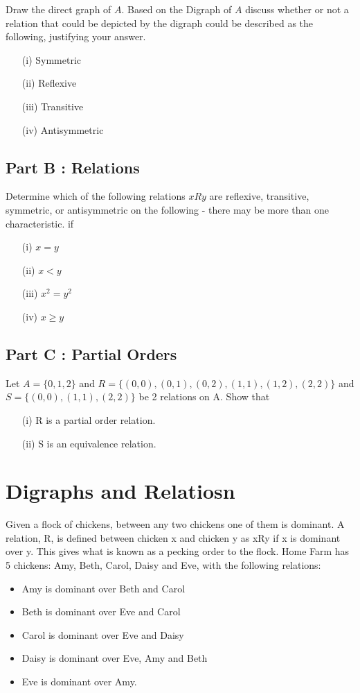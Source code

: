 Draw the direct graph of $A$. Based on the Digraph of $A$ discuss whether or not a relation that could be depicted by the digraph could be described as the following, justifying your answer.


\begin{itemize}
\item[(i)] Symmetric
\item[(ii)] Reflexive 
\item[(iii)] Transitive
\item[(iv)] Antisymmetric
\end{itemize}
\subsection*{Part B : Relations}
Determine which of the following relations $ x R y$ are reflexive, transitive, symmetric, or antisymmetric on the following - there may be more than one characteristic.  if

\begin{itemize} 
\item[(i)] $x = y$
\item[(ii)] $x < y$
\item[(iii)] $x^2 = y^2$
\item[(iv)] $x \geq y$
\end{itemize}
\subsection*{Part C : Partial Orders}

Let $A=\{0,1,2\}$ and $R=\{ (0,0),(0,1),(0,2),(1,1), (1,2), (2,2)\}$
and $S=\{(0,0),(1,1),(2,2)\}$ be 2 relations on A. Show that

\begin{itemize}
\item[(i)] R is a partial order relation.
\item[(ii)] S is an equivalence relation.
\end{itemize}



\section{Digraphs and Relatiosn}
Given a flock of chickens, between any two chickens one of them is
dominant. A relation, R, is defined between chicken x and chicken y as xRy if x is
dominant over y. This gives what is known as a pecking order to the flock. Home
Farm has 5 chickens: Amy, Beth, Carol, Daisy and Eve, with the following relations:

\begin{itemize}
\item Amy is dominant over Beth and Carol
\item Beth is dominant over Eve and Carol
\item Carol is dominant over Eve and Daisy
\item Daisy is dominant over Eve, Amy and Beth
\item Eve is dominant over Amy.
\end{itemize}

\newpage
